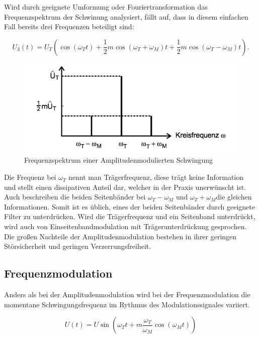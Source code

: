 Wird durch geeignete Umformung oder Fouriertransformation das Frequenzspektrum der Schwinung analysiert, fällt auf, dass in diesem einfachen Fall bereits drei Frequenzen beteiligt sind:

\begin{equation}
U_{3}(t) = U_T ( \cos(\omega_T t) + \frac{1}{2}m\cos(\omega_T + \omega_M)t + \frac{1}{2}m\cos(\omega_T - \omega_M)t).
\label{eq:FreqAmMod}
\end{equation}

\begin{figure}
	\centering
	\includegraphics[width=\textwidth]{img/Abb2.png}
	\caption{Frequenzspektrum einer Amplitudenmodulierten Schwingung \cite{FP}}
\end{figure}

Die Frequenz bei $\omega_T$ nennt man Trägerfrequenz, diese trägt keine Information und stellt einen dissipativen Anteil dar, welcher in der Praxis unerwünscht ist. Auch beschreiben die beiden Seitenbänder bei $\omega_T - \omega_M$ und $\omega_T + \omega_M$die gleichen Informationen. Somit ist es üblich, eines der beiden Seitenbänder durch geeignete Filter zu unterdrücken.
Wird die Trägerfrequenz und ein Seitenband unterdrückt, wird auch von Einseitenbandmodulation mit Trägerunterdrückung gesprochen.
Die großen Nachteile der Amplitudenmodulation bestehen in ihrer geringen Störsicherheit und geringen Verzerrungsfreiheit.

\subsection{Frequenzmodulation}
Anders als bei der Amplitudenmodulation wird bei der Frequenzmodulation die momentane Schwingungsfrequenz im Rythmus des Modulationssignales variiert.

\begin{equation}
U(t)= U\sin(\omega_T t + m \frac{\omega_T}{\omega_M} \cos(\omega_M t))
\label{eq:FreqMod}
\end{equation}

